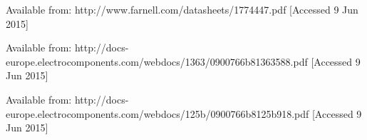 \begin{thebibliography}{99}















Available from: http://www.farnell.com/datasheets/1774447.pdf [Accessed 9 Jun 2015]

Available from: http://docs-europe.electrocomponents.com/webdocs/1363/0900766b81363588.pdf [Accessed 9 Jun 2015]

Available from: http://docs-europe.electrocomponents.com/webdocs/125b/0900766b8125b918.pdf [Accessed 9 Jun 2015]

\end{thebibliography}